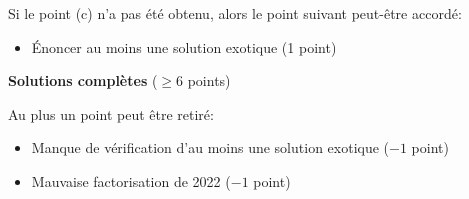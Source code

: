 {Si le point (c) n'a pas été obtenu, alors le point suivant peut-être accordé:
\begin{itemize}
\item Énoncer au moins une solution exotique \dotfill (1 point)
\end{itemize}

\textbf{Solutions complètes} \dotfill ($\geq 6$ points)

Au plus un point peut être retiré:
\begin{itemize}
\item Manque de vérification d'au moins une solution exotique \dotfill ($-1$ point)
\item Mauvaise factorisation de 2022 \dotfill ($-1$ point)
\end{itemize}
}